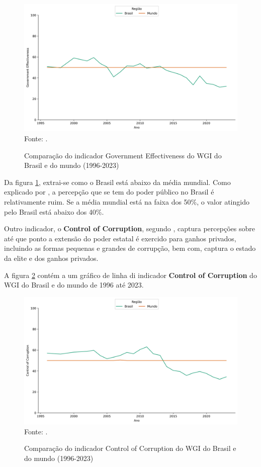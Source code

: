 \begin{figure}[H]
	\centering
	\caption{Comparação do indicador Government Effectiveness do WGI do Brasil e do mundo (1996-2023)}
	\includegraphics[width=1\linewidth]{figuras/comparacao_wgi_ge_brasil_mundo}
	\label{fig:comparacao_wgi_ge_brasil_mundo}
	\footnotesize{Fonte: \cite{wgi_dados}.}
\end{figure}

Da figura \ref{fig:comparacao_wgi_ge_brasil_mundo}, extrai-se como o Brasil está abaixo da média mundial. Como explicado por \cite{kaufmann2024worldwide}, a percepção que se tem do poder público no Brasil é relativamente ruim. Se a média mundial está na faixa dos 50\%, o valor atingido pelo Brasil está abaixo dos 40\%.

Outro indicador, o \textbf{Control of Corruption}, segundo \cite{kaufmann2024worldwide}, captura percepções sobre até que ponto a extensão do poder estatal é exercido para ganhos privados, incluindo as formas pequenas e grandes de corrupção, bem com, captura o estado da elite e dos ganhos privados.

A figura \ref{fig:comparacao_wgi_cc_brasil_mundo} contém a um gráfico de linha di indicador \textbf{Control of Corruption} do WGI do Brasil e do mundo de 1996 até 2023.

\begin{figure}[H]
	\centering
	\caption{Comparação do indicador Control of Corruption do WGI do Brasil e do mundo (1996-2023)}
	\includegraphics[width=1\linewidth]{figuras/comparacao_wgi_cc_brasil_mundo}
	\label{fig:comparacao_wgi_cc_brasil_mundo}
	\footnotesize{Fonte: \cite{wgi_dados}.}
\end{figure}

